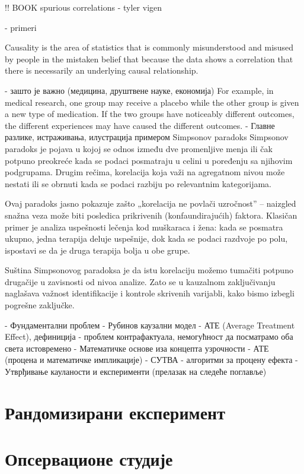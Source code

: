 \documentclass[12pt, a4paper]{article}
\begin{document}
!! BOOK spurious correlations - tyler vigen

- primeri 
 

Causality is the area of statistics that is commonly misunderstood and misused by people in the mistaken belief that 
because the data shows a correlation that there is necessarily an underlying causal relationship. 

    - зашто је важно (медицина, друштвене науке, економија)
    For example, in medical research, one group may receive a placebo while the other group is given a new type of medication. 
    If the two groups have noticeably different outcomes, the different experiences may have caused the different outcomes.
    - Главне разлике, истраживања, илустрација примером 
    Simpsonov paradoks
    Simpsonov paradoks je pojava u kojoj se odnos između dve promenljive menja ili čak potpuno preokreće kada se podaci 
    posmatraju u celini u poređenju sa njihovim podgrupama. Drugim rečima, korelacija koja važi na agregatnom nivou može 
    nestati ili se obrnuti kada se podaci razbiju po relevantnim kategorijama.

Ovaj paradoks jasno pokazuje zašto „korelacija ne povlači uzročnost” – naizgled snažna veza može biti posledica prikrivenih 
(konfaundirajućih) faktora. Klasičan primer je analiza uspešnosti lečenja kod muškaraca i žena: kada se posmatra ukupno, 
jedna terapija deluje uspešnije, dok kada se podaci razdvoje po polu, ispostavi se da je druga terapija bolja u obe grupe.

Suština Simpsonovog paradoksa je da istu korelaciju možemo tumačiti potpuno drugačije u zavisnosti od nivoa analize. 
Zato se u kauzalnom zaključivanju naglašava važnost identifikacije i kontrole skrivenih varijabli, kako bismo izbegli 
pogrešne zaključke.


- Фундаментални проблем 
    - Рубинов каузални модел
    - АТЕ (Average Treatment Effect), дефиниција
    - проблем контрафактуала, немогућност да посматрамо оба света истовремено
- Математичке основе иза концепта узрочности
    - АТЕ (процена и математичке импликације)
    - СУТВА
    - алгоритми за процену ефекта
- Утврђивање кауланости и експерименти (прелазак на следеће поглавље) 

\newpage



\section{Рандомизирани експеримент}
\newpage



\section{Опсервационе студије}
\end{document}
